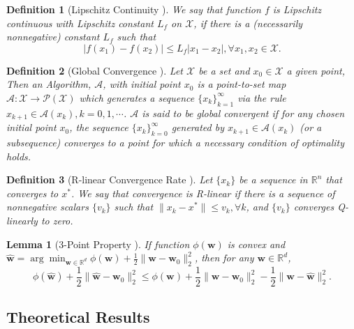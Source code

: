 \documentclass{article}
\newtheorem{lemma}{Lemma}
\newtheorem{defi}{Definition}
\begin{document}
			
			
    
		
	
\begin{defi}[Lipschitz Continuity \cite{erikssonapplied}]\label{defi:Lipschitz}
We say that function $f$ is {\em Lipschitz continuous} with Lipschitz constant $L_f$ on $\mathcal{X}$, if there is a (necessarily nonnegative) constant $L_f$ such that
$$|f(x_1)-f(x_2)|\leq L_f|x_1-x_2|, \forall x_1 , x_2 \in \mathcal{X}.$$
\end{defi}

\begin{defi}[Global Convergence \cite{lanckriet2009convergence}]\label{def:gl_conv}
Let $\mathcal{X}$ be a set and $x_0\in\mathcal{X}$ a given point, Then an Algorithm, $\mathcal{A}$, with initial point $x_0$ is a point-to-set map $\mathcal{A}: \mathcal{X}\rightarrow\mathcal{P}(\mathcal{X})$ which generates a sequence $\{x_k\}_{k=1}^{\infty}$ via the rule $x_{k+1}\in \mathcal{A}(x_k), k=0,1,\cdots$. $\mathcal{A}$ is said to be {\em global convergent} if for any chosen initial point $x_0$, the sequence $\{x_k\}_{k=0}^{\infty}$ generated by $x_{k+1}\in \mathcal{A}(x_k)$ (or a subsequence) converges to a point for which a necessary condition of optimality holds.
\end{defi}
    
\begin{defi}[R-linear Convergence Rate \cite{nocedal99}]\label{defi:rate}
Let $\{x_k\}$ be a sequence in $\mathbb{R}^n$ that converges to $x^*$. We say that convergence is {\em R-linear} if there is a sequence of nonnegative scalars $\{v_k\}$ such that $\|x_k-x^*\|\leq v_k, \forall k$, and $\{v_k\}$ converges Q-linearly to zero.
\end{defi}    

\begin{lemma}[3-Point Property \cite{Baldassarre}]\label{lem:3-point}
If function $\phi(\mathbf{w})$ is convex and $\hat{\mathbf{w}}=\arg\min_{\mathbf{w}\in\mathbb{R}^d}\phi(\mathbf{w})+\frac{1}{2}\|\mathbf{w}-\mathbf{w}_0\|_2^2$, then for any $\mathbf{w}\in\mathbb{R}^d$,
$$
\phi(\hat{\mathbf{w}})+\frac{1}{2}\|\hat{\mathbf{w}}-\mathbf{w}_0\|_2^2\leq\phi(\mathbf{w})+\frac{1}{2}\|\mathbf{w}-\mathbf{w}_0\|_2^2-\frac{1}{2}\|\mathbf{w}-\hat{\mathbf{w}}\|_2^2.
$$
\end{lemma}

\subsection{Theoretical Results}
\end{document}
